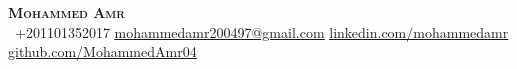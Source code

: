 \begin{center}
    \textbf{\Huge \scshape Mohammed Amr} \\[2pt]
     \ \small +201101352017 \quad
    \href{mailto:mohammedamr200497@gmail.com}{ \underline{mohammedamr200497@gmail.com}} \quad
    \href{https://www.linkedin.com/in/mohammed-amr-abd-elsayed/}{ \underline{linkedin.com/mohammedamr}} \\[4pt]
    \href{https://github.com/MohammedAmr04}{ \underline{github.com/MohammedAmr04}} \quad
\end{center}

